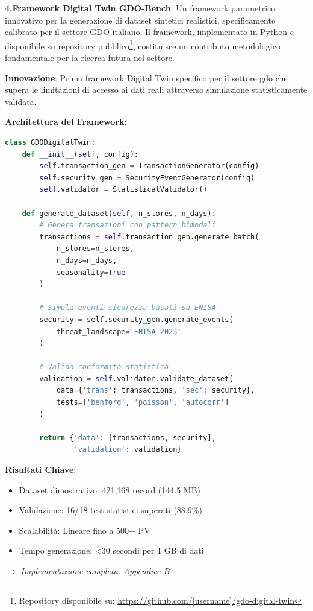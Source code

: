 
\textbf{4.Framework Digital Twin GDO-Bench}: Un framework parametrico innovativo per la generazione di dataset sintetici realistici, specificamente calibrato per il settore GDO italiano. Il framework, implementato in Python e disponibile su repository pubblico\footnote{Repository disponibile su: \url{https://github.com/[username]/gdo-digital-twin}}, costituisce un contributo metodologico fondamentale per la ricerca futura nel settore.

\begin{tcolorbox}[title={Innovation Box 1.4: Framework Digital Twin GDO-Bench}, colback=blue!5, colframe=blue!75!black, fonttitle=\bfseries, boxrule=1.5pt, arc=2mm, breakable]

\textbf{Innovazione}: Primo framework Digital Twin specifico per il settore \gls{gdo} che supera le limitazioni di accesso ai dati reali attraverso simulazione statisticamente validata.

\textbf{Architettura del Framework}:
\begin{lstlisting}[language=Python, basicstyle=\small\ttfamily]
class GDODigitalTwin:
    def __init__(self, config):
        self.transaction_gen = TransactionGenerator(config)
        self.security_gen = SecurityEventGenerator(config)
        self.validator = StatisticalValidator()
    
    def generate_dataset(self, n_stores, n_days):
        # Genera transazioni con pattern bimodali
        transactions = self.transaction_gen.generate_batch(
            n_stores=n_stores,
            n_days=n_days,
            seasonality=True
        )
        
        # Simula eventi sicurezza basati su ENISA
        security = self.security_gen.generate_events(
            threat_landscape='ENISA-2023'
        )
        
        # Valida conformità statistica
        validation = self.validator.validate_dataset(
            data={'trans': transactions, 'sec': security},
            tests=['benford', 'poisson', 'autocorr']
        )
        
        return {'data': [transactions, security], 
                'validation': validation}
\end{lstlisting}

\textbf{Risultati Chiave}:
\begin{itemize}
\item Dataset dimostrativo: 421,168 record (144.5 MB)
\item Validazione: 16/18 test statistici superati (88.9\%)
\item Scalabilità: Lineare fino a 500+ PV
\item Tempo generazione: <30 secondi per 1 GB di dati
\end{itemize}


$\rightarrow$ \textit{Implementazione completa: Appendice B}
\end{tcolorbox}

